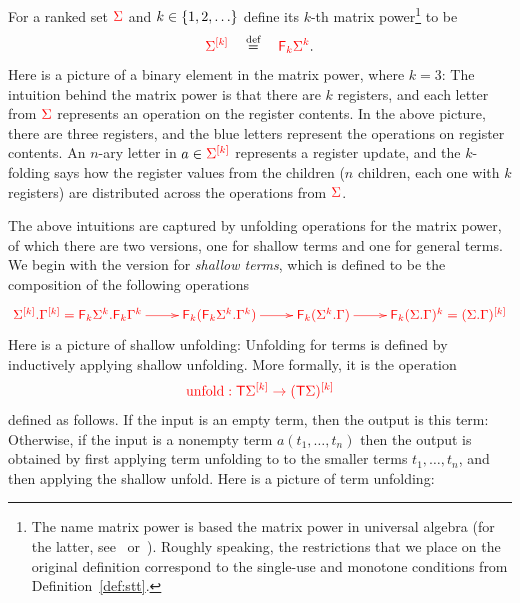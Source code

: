 For a ranked set $\rSigma$ and $k \in \set{1,2,\ldots}$ define its $k$-th matrix power\footnote{
           The name  matrix power is based the matrix power in  universal algebra (for the latter, see~\cite{Taylor1975} or~\cite{szendrei1990simple}). Roughly speaking, the restrictions that we place on the original definition correspond to the single-use and monotone conditions from Definition~\ref{def:stt}. 
        } 
to be 
\begin{align*}
    \mati k \rSigma \quad \eqdef \quad \ranked{\reduce k \rSigma^k}.
\end{align*}
Here is a picture of a binary element in the matrix power, where $k=3$:
The intuition behind the matrix power is that there are $k$ registers, and each letter from $\rSigma$ represents an operation on the register contents. In the above picture, there are three registers, and the blue letters represent the operations on  register contents. An $n$-ary letter in $a \in \mati k \rSigma$ represents a register update, and the $k$-folding says how the register values from the children ($n$ children, each one with $k$ registers) are distributed across the operations from $\rSigma$. 

The above intuitions are captured by unfolding operations for the matrix power, of which there are two versions, one for  shallow terms and one for general terms. We begin with the version for    \emph{shallow terms}, which is defined to be  the composition of the following operations
\begin{align*}
\ranked{
    \xymatrix{
        \shallowterm{\mati k \rSigma} {\mati k \rGamma} = {\shallowterm{\reduce k {\Sigma^k}}{\reduce k {\Gamma^k}}} \ar[r] &
        \reduce k(\shallowterm{\reduce k {\Sigma^k}}{ {\Gamma^k}}) \ar[r] &
        \reduce k(\shallowterm{\Sigma^k}{ {\Gamma}}) \ar[r] &
        \reduce k(\shallowterm{\Sigma}{ {\Gamma}})^k = \mati k {(\shallowterm \Sigma \Gamma)}
    }
}
\end{align*}
Here is a picture of shallow unfolding:
Unfolding for terms is defined by inductively applying shallow unfolding. More formally, it is the  operation 
\begin{align*}
    \ranked{\unfold : \tmonad \mati k \rSigma \to \mati k {(\tmonad \Sigma)} }
    \end{align*}
defined as follows. If the input is an empty term, then the output is this term:
Otherwise, if the input is a nonempty term $a(t_1,\ldots,t_n)$ then the output is obtained by first applying term unfolding to to the smaller terms $t_1,\ldots,t_n$, and then applying the shallow unfold. Here is a picture of term unfolding: 

